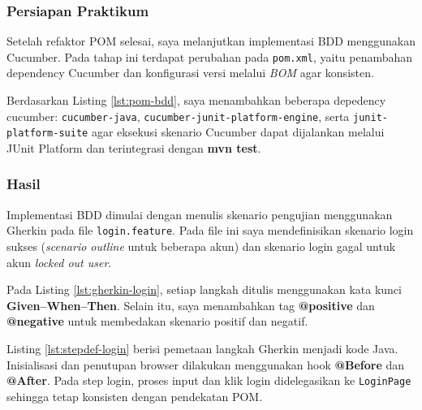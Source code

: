 \documentclass[a4paper,oneside,11pt]{book}
\newcounter{subsubsubsection}[subsubsection]
\begin{document}
\subsubsection{Persiapan Praktikum}
\par Setelah refaktor POM selesai, saya melanjutkan implementasi BDD menggunakan Cucumber. Pada tahap ini terdapat perubahan pada \texttt{pom.xml}, yaitu penambahan dependency Cucumber dan konfigurasi versi melalui \textit{BOM} agar konsisten.



\par Berdasarkan Listing \ref{lst:pom-bdd}, saya menambahkan beberapa depedency cucumber: \texttt{cucumber-java}, \texttt{cucumber-junit-platform-engine}, serta \texttt{junit-platform-suite} agar eksekusi skenario Cucumber dapat dijalankan melalui JUnit Platform dan terintegrasi dengan \textbf{mvn test}.

\subsubsection{Hasil}
\par Implementasi BDD dimulai dengan menulis skenario pengujian menggunakan Gherkin pada file \texttt{login.feature}. Pada file ini saya mendefinisikan skenario login sukses (\textit{scenario outline} untuk beberapa akun) dan skenario login gagal untuk akun \textit{locked out user}.



\par Pada Listing \ref{lst:gherkin-login}, setiap langkah ditulis menggunakan kata kunci \textbf{Given--When--Then}. Selain itu, saya menambahkan tag \textbf{@positive} dan \textbf{@negative} untuk membedakan skenario positif dan negatif.



\par Listing \ref{lst:stepdef-login} berisi pemetaan langkah Gherkin menjadi kode Java. Inisialisasi dan penutupan browser dilakukan menggunakan hook \textbf{@Before} dan \textbf{@After}. Pada step login, proses input dan klik login didelegasikan ke \texttt{LoginPage} sehingga tetap konsisten dengan pendekatan POM.
\end{document}
